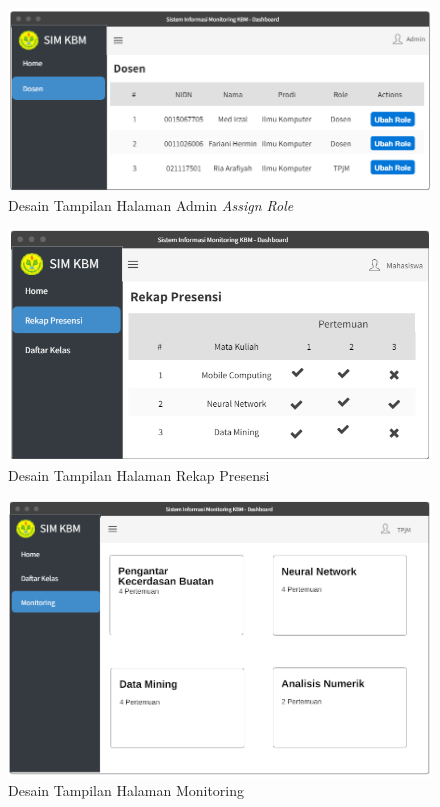 \begin{figure}[h!]
	\centering
	\includegraphics[width=1\textwidth]{gambar/mockup/admin_dosen}
	\caption{Desain Tampilan Halaman Admin \textit{Assign Role}}
	\label{fig:mockadmin}
\end{figure}

\begin{figure}[h!]
	\centering
	\includegraphics[width=1\textwidth]{gambar/mockup/rekap_presensi}
	\caption{Desain Tampilan Halaman Rekap Presensi}
	\label{fig:mockrekappresensi}
\end{figure}

\begin{figure}[h!]
	\centering
	\includegraphics[width=1\textwidth]{gambar/mockup/monitoring}
	\caption{Desain Tampilan Halaman Monitoring}
	\label{fig:mockmonitoring}
\end{figure}

